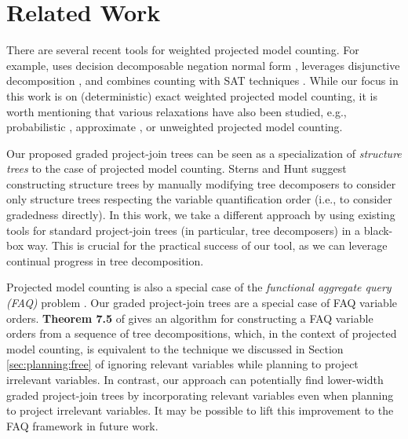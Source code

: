 



\section{Related Work}

There are several recent tools for weighted projected model counting.
For example, \dfp{} uses decision decomposable negation normal form \cite{lagniez2019recursive}, \projmc{} leverages disjunctive decomposition \cite{lagniez2019recursive}, and \ssat{} combines counting with SAT techniques \cite{lee2017solving}. 
While our focus in this work is on (deterministic) exact weighted projected model counting, it is worth mentioning that various relaxations have also been studied, e.g., probabilistic \cite{sharma2019ganak}, approximate \cite{ermon2013taming,fremont2017maximum,soos2019bird}, or unweighted \cite{zawadzki2013generalization,aziz2015projected,mohle2018dualizing,hecher2020taming} projected model counting.

Our proposed graded project-join trees can be seen as a specialization of \emph{structure trees} \cite{stearns2002exploiting} to the case of projected model counting. Sterns and Hunt \cite{stearns2002exploiting} suggest constructing structure trees by manually modifying tree decomposers to consider only structure trees respecting the variable quantification order (i.e., to consider gradedness directly). In this work, we take a different approach by using existing tools for standard project-join trees (in particular, tree decomposers) in a black-box way. This is crucial for the practical success of our tool, as we can leverage continual progress in tree decomposition. 

Projected model counting is also a special case of the \emph{functional aggregate query (FAQ)} problem \cite{abo2016faq}. Our graded project-join trees are a special case of FAQ variable orders. \textbf{Theorem 7.5} of \cite{abo2016faq} gives an algorithm for constructing a FAQ variable orders from a sequence of tree decompositions, which, in the context of projected model counting, is equivalent to the technique we discussed in Section \ref{sec:planning:free} of ignoring relevant variables while planning to project irrelevant variables. In contrast, our approach can potentially find lower-width graded project-join trees by incorporating relevant variables even when planning to project irrelevant variables. It may be possible to lift this improvement to the FAQ framework in future work.

